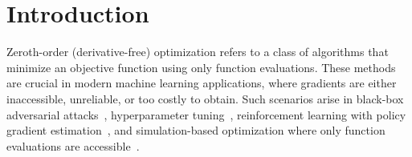 \documentclass[twoside]{article}
\theoremstyle{plain}
\theoremstyle{definition}
\theoremstyle{remark}
\begin{document}
%

%




\begin{abstract}
We revisit random search for stochastic optimization, where only noisy function evaluations are available. We show that the method works under weaker smoothness assumptions than previously considered, and that stronger assumptions enable improved guarantees. In the finite-sum setting, we design a variance-reduced variant that leverages multiple samples to accelerate convergence. Our analysis relies on a simple translation invariance property, which provides a principled way to balance noise and reduce variance.
\end{abstract}

\section{Introduction}
Zeroth-order (derivative-free) optimization refers to a class of algorithms that minimize an objective function using only function evaluations. These methods are crucial in modern machine learning applications, where gradients are either inaccessible, unreliable, or too costly to obtain. Such scenarios arise in black-box adversarial attacks~\cite{chen2017zoo, ughi2022empirical}, hyperparameter tuning~\cite{koch2018autotune, turner2021bayesian}, reinforcement learning with policy gradient estimation~\cite{malik2020derivative, mania2018simple}, and simulation-based optimization where only function evaluations are accessible~\cite{conn2009introduction}.
\end{document}

